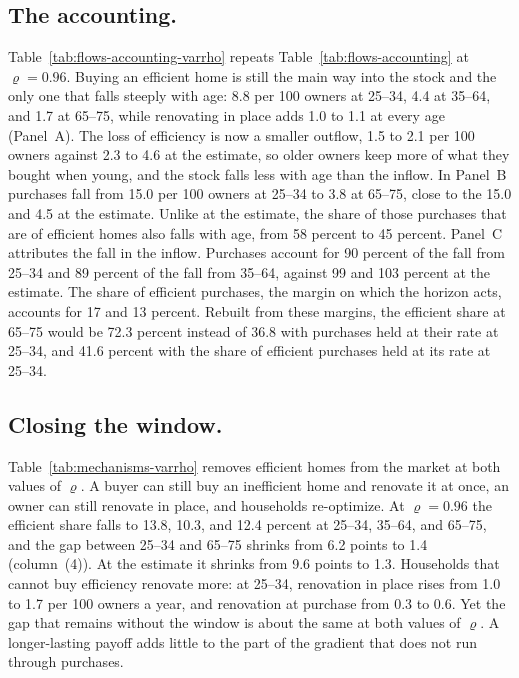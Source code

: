 \subsection{The accounting.}\label{app:varrho-accounting}
Table~\ref{tab:flows-accounting-varrho} repeats
Table~\ref{tab:flows-accounting} at $\varrho=0.96$. Buying an efficient home
is still the main way into the stock and the only one that falls steeply
with age: 8.8 per 100 owners at 25--34, 4.4 at 35--64, and 1.7 at 65--75,
while renovating in place adds 1.0 to 1.1 at every age (Panel~A). The loss of
efficiency is now a smaller outflow, 1.5 to 2.1 per 100 owners against 2.3 to
4.6 at the estimate, so older owners keep more of what they bought when
young, and the stock falls less with age than the inflow. In Panel~B
purchases fall from 15.0 per 100 owners at 25--34 to 3.8 at 65--75, close to
the 15.0 and 4.5 at the estimate. Unlike at the estimate, the share of those
purchases that are of efficient homes also falls with age, from 58 percent to
45 percent. Panel~C attributes the fall in the inflow. Purchases account for
90 percent of the fall from 25--34 and 89 percent of the fall from 35--64,
against 99 and 103 percent at the estimate. The share of efficient
purchases, the margin on which the horizon acts, accounts for 17 and 13
percent. Rebuilt from these margins, the efficient share at 65--75 would be
72.3 percent instead of 36.8 with purchases held at their rate at 25--34, and
41.6 percent with the share of efficient purchases held at its rate at
25--34.

\subsection{Closing the window.}\label{app:varrho-window}
Table~\ref{tab:mechanisms-varrho} removes efficient homes from the market at
both values of $\varrho$. A buyer can still buy an inefficient home and
renovate it at once, an owner can still renovate in place, and households
re-optimize. At $\varrho=0.96$ the efficient share falls to 13.8, 10.3, and
12.4 percent at 25--34, 35--64, and 65--75, and the gap between 25--34 and
65--75 shrinks from 6.2 points to 1.4 (column~(4)). At the estimate it shrinks
from 9.6 points to 1.3. Households that cannot buy efficiency renovate more:
at 25--34, renovation in place rises from 1.0 to 1.7 per 100 owners a year,
and renovation at purchase from 0.3 to 0.6. Yet the gap that remains without
the window is about the same at both values of $\varrho$. A longer-lasting
payoff adds little to the part of the gradient that does not run through
purchases.

